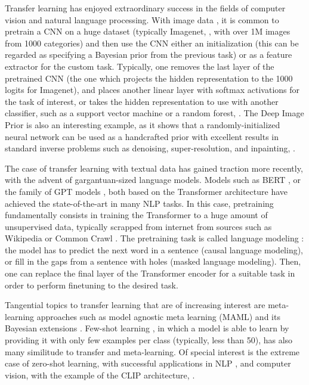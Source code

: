 Transfer learning has enjoyed extraordinary success in the fields of computer vision and natural language processing. With image data \citep{girshick2014rich,NIPS2014_375c7134}, it is common to pretrain a CNN on a huge dataset (typically Imagenet, \cite{deng2009imagenet}, with over 1M images from 1000 categories) and then use the CNN either an initialization (this can be regarded as specifying a Bayesian prior from the previous task) or as a feature extractor for the custom task. Typically, one removes the last layer of the pretrained CNN (the one which projects the hidden representation to the 1000 logits for Imagenet), and places another linear layer with softmax activations for the task of interest, or takes the hidden representation to use with another classifier, such as a support vector machine or a random forest, \citep{sharif2014cnn}. The Deep Image Prior is also an interesting example, as it shows that a randomly-initialized neural network can be used as a handcrafted prior with excellent results in standard inverse problems such as denoising, super-resolution, and inpainting, \cite{ulyanov2020deep}.

The case of transfer learning with textual data has gained traction more recently, with the advent of gargantuan-sized language models. Models such as BERT \citep{devlin2018bert}, or the family of GPT models \citep{radford2018improving,radford2019language,cc:BrownMannRyderSubbiahEtAl:2020:language-models}, both based on the Transformer architecture have achieved the state-of-the-art in many NLP tasks. In this case, pretraining fundamentally consists in training the Transformer to a huge amount of unsupervised data, typically scrapped from internet from sources such as Wikipedia or Common Crawl \citep{cc:BrownMannRyderSubbiahEtAl:2020:language-models}. The pretraining task is called language modeling \citep{2008SchpJ...3.3881B}: the model has to predict the next word in a sentence (causal language modeling), or fill in the gaps from a sentence with holes (masked language modeling). Then, one can replace the final layer of the Transformer encoder for a suitable task in order to perform finetuning to the desired task.

Tangential topics to transfer learning that are of increasing interest are meta-learning approaches such as model agnostic meta learning (MAML) \citep{pmlr-v70-finn17a} and its Bayesian extensions \citep{NEURIPS2018_e1021d43}. Few-shot learning \citep{wang2020generalizing}, in which a model is able to learn by providing it with only few examples per class (typically, less than 50),  has also many similitude to transfer and meta-learning. Of special interest is the extreme case of zero-shot learning, with successful applications in NLP \citep{yinroth2019zeroshot}, and computer vision, with the example of the CLIP architecture, \cite{radford2021learning}. 



